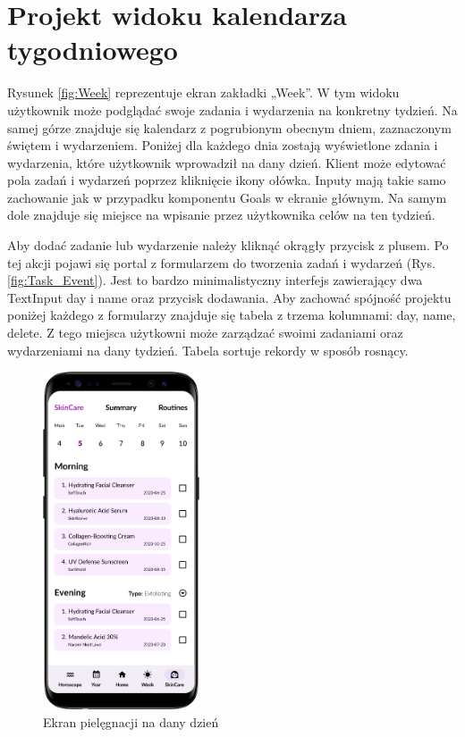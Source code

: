 \section*{Projekt widoku kalendarza tygodniowego}
Rysunek \ref{fig:Week} reprezentuje ekran zakładki „Week”. W tym widoku  użytkownik może podglądać swoje zadania i wydarzenia na konkretny tydzień. Na samej górze znajduje się kalendarz z pogrubionym obecnym dniem, zaznaczonym świętem i wydarzeniem. Poniżej dla każdego dnia zostają wyświetlone zdania i wydarzenia, które użytkownik wprowadził na dany dzień. Klient może edytować pola zadań i wydarzeń poprzez kliknięcie ikony ołówka. Inputy mają takie samo zachowanie jak w przypadku komponentu Goals w ekranie głównym. Na samym dole znajduje się miejsce na wpisanie przez użytkownika celów na ten tydzień.

Aby dodać zadanie lub wydarzenie należy kliknąć okrągły przycisk z plusem. Po tej akcji pojawi się portal z formularzem do tworzenia zadań i wydarzeń (Rys. \ref{fig:Task_Event}). Jest to bardzo minimalistyczny interfejs zawierający dwa TextInput day i name oraz przycisk dodawania. Aby zachować spójność projektu poniżej każdego z formularzy znajduje się tabela z trzema kolumnami: day, name, delete. Z tego miejsca użytkowni może zarządzać swoimi zadaniami oraz wydarzeniami na dany tydzień. Tabela sortuje rekordy w sposób rosnący.

\begin{figure}[t]
	\begin{center}
		\begin{minipage}{0.4\textwidth}
			\centering
			\includegraphics[height=10cm, keepaspectratio]{images/interfejs_figma/SkinCare}
			\caption{Ekran pielęgnacji na dany dzień}
			\label{fig:SkinCare}
		\end{minipage}
	\end{center}
\end{figure}

